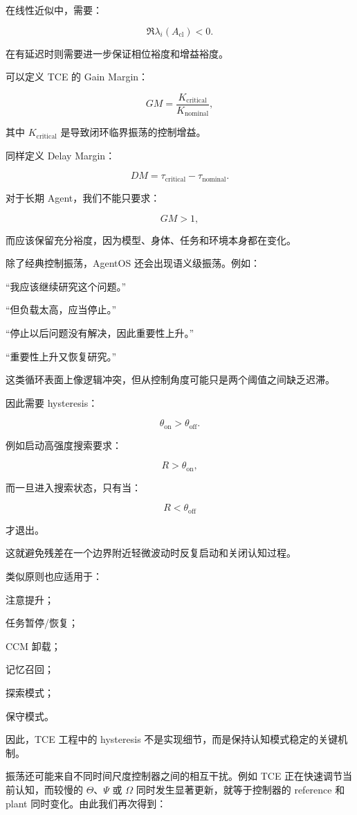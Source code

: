 在线性近似中，需要：

\[
\Re\lambda_i(A_{\mathrm{cl}})<0.
\]

在有延迟时则需要进一步保证相位裕度和增益裕度。

可以定义 TCE 的 Gain Margin：

\[
GM
=
\frac{K_{\mathrm{critical}}}{K_{\mathrm{nominal}}},
\]

其中 $K_{\mathrm{critical}}$ 是导致闭环临界振荡的控制增益。

同样定义 Delay Margin：

\[
DM
=
\tau_{\mathrm{critical}}
-
\tau_{\mathrm{nominal}}.
\]

对于长期 Agent，我们不能只要求：

\[
GM>1,
\]

而应该保留充分裕度，因为模型、身体、任务和环境本身都在变化。

除了经典控制振荡，AgentOS 还会出现语义级振荡。例如：

“我应该继续研究这个问题。”

“但负载太高，应当停止。”

“停止以后问题没有解决，因此重要性上升。”

“重要性上升又恢复研究。”

这类循环表面上像逻辑冲突，但从控制角度可能只是两个阈值之间缺乏迟滞。

因此需要 hysteresis：

\[
\theta_{\mathrm{on}}
>
\theta_{\mathrm{off}}.
\]

例如启动高强度搜索要求：

\[
R>\theta_{\mathrm{on}},
\]

而一旦进入搜索状态，只有当：

\[
R<\theta_{\mathrm{off}}
\]

才退出。

这就避免残差在一个边界附近轻微波动时反复启动和关闭认知过程。

类似原则也应适用于：

注意提升；

任务暂停/恢复；

CCM 卸载；

记忆召回；

探索模式；

保守模式。

因此，TCE 工程中的 hysteresis 不是实现细节，而是保持认知模式稳定的关键机制。

振荡还可能来自不同时间尺度控制器之间的相互干扰。例如 TCE 正在快速调节当前认知，而较慢的 $\Theta$、$\Psi$ 或 $\Omega$ 同时发生显著更新，就等于控制器的 reference 和 plant 同时变化。由此我们再次得到：

